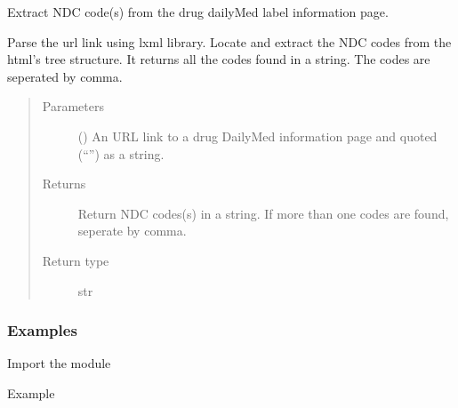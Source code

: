 \documentclass[letterpaper,10pt,english]{sphinxmanual}
\begin{document}
\begin{fulllineitems}
\label{\detokenize{biomarker_extraction:biomarker_extraction.ndc_code}}
\sphinxAtStartPar
Extract NDC code(s) from the drug dailyMed label information page.

\sphinxAtStartPar
Parse the url link using lxml library. Locate and extract the NDC codes from the html’s tree structure. It returns all the codes found in a string. The codes are seperated by comma.
\begin{quote}\begin{description}
\item[{Parameters}] \leavevmode
\sphinxAtStartPar
{} () \textendash{} An URL link to a drug DailyMed information page
and quoted (“”) as a string.

\item[{Returns}] \leavevmode
\sphinxAtStartPar
Return NDC codes(s) in a string. If more than one codes are found,
seperate by comma.

\item[{Return type}] \leavevmode
\sphinxAtStartPar
str

\end{description}\end{quote}
\subsubsection*{Examples}

\sphinxAtStartPar
Import the module

\begin{sphinxVerbatim}[commandchars=\\\{\}]
   
\end{sphinxVerbatim}

\sphinxAtStartPar
Example

\begin{sphinxVerbatim}[commandchars=\\\{\}]
  
  
\end{sphinxVerbatim}

\end{fulllineitems}
\end{document}
